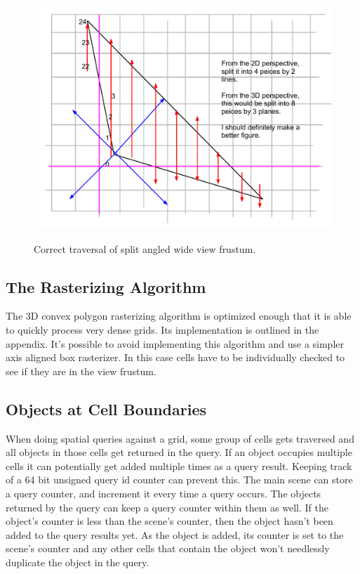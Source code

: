 \documentclass[12pt]{ucthesis}
\newcommand{\captionfonts}{\small\bf\ssp}
\begin{document}
\begin{figure}
\begin{center}
\includegraphics[width=\textwidth]{Images/wide-traversal.pdf}
\captionfonts
\caption[Corret Wide View Frustum]{Correct traversal of split angled wide view frustum.}
\label{fig:correct-wide-frustum-iter}
\end{center}
\end{figure}

\subsection{The Rasterizing Algorithm}
\label{the-rasterizing-algorithm}
The 3D convex polygon rasterizing algorithm is optimized enough that it is able to quickly process very dense grids.
Its implementation is outlined in the appendix.
It's possible to avoid implementing this algorithm and use a simpler axis aligned box rasterizer.
In this case cells have to be individually checked to see if they are in the view frustum.

\subsection{Objects at Cell Boundaries}
\label{objects-at-cell-boundaries}
When doing spatial queries against a grid, some group of cells gets traversed and all objects in those cells get returned in the query.
If an object occupies multiple cells it can potentially get added multiple times as a query result.
Keeping track of a 64 bit unsigned query id counter can prevent this.
The main scene can store a query counter, and increment it every time a query occurs.
The objects returned by the query can keep a query counter within them as well.
If the object's counter is less than the scene's counter, then the object hasn't been added to the query results yet.
As the object is added, its counter is set to the scene's counter and any other cells that contain the object won't needlessly duplicate the object in the query.
\end{document}
